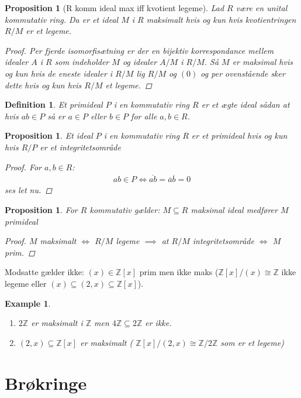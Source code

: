 \documentclass[10pt,twoside,openany,final]{memoir}
\theoremstyle{break}
\newtheorem{proposition}[section]{Proposition}
\newtheorem{definition}[section]{Definition}
\theoremstyle{Break}
\newtheorem{example}[section]{Example}
\newcommand{\Z}{\mathbb{Z}}
\begin{document}
\begin{proposition}[R komm ideal max iff kvotient legeme]
Lad $R$ være en unital kommutativ ring. Da er et ideal $M$ i $R$ maksimalt hvis og kun hvis kvotientringen $R/M$ er et legeme.
\begin{proof}
Per fjerde isomorfisætning er der en bijektiv korrespondance mellem idealer $A$ i $R$ som indeholder $M$ og idealer $A/M$ i $R/M$. Så $M$ er maksimal hvis og kun hvis de eneste idealer i $R/M$ lig $R/M$ og $(0)$ og per ovenstående sker dette hvis og kun hvis $R/M$ et legeme.
\end{proof}
\end{proposition}

\begin{definition}
Et primideal $P$ i en kommutativ ring $R$ er et ægte ideal sådan at hvis $ab \in P$ så er $a \in P$ eller $b \in P$ for alle $a,b \in R$.
\end{definition}

\begin{proposition}
Et ideal $P$ i en kommutativ ring $R$ er et primideal hvis og kun hvis $R/P$ er et integritetsområde
\begin{proof}
For $a,b \in R$: 
\begin{align*}
ab \in P \iff \overline{ab}=\overline{a}\overline{b}=0
\end{align*}
ses let nu.
\end{proof}
\end{proposition}

\begin{proposition}
For $R$ kommutativ gælder: $M \subseteq R$ maksimal ideal medfører $M$ primideal
\begin{proof}
$M$ maksimalt $\iff$ $R/M$ legeme $\implies$ at $R/M$ integritetsområde $\iff$ $M$ prim.
\end{proof}
\end{proposition}
Modsatte gælder ikke: $(x) \in \Z[x]$ prim men ikke maks ($\Z[x]/(x) \cong \Z$ ikke legeme eller $(x) \subseteq (2,x) \subseteq \Z[x]$).
\begin{example}
\begin{enumerate}
\item $2\Z$ er maksimalt i $\Z$ men $4\Z \subseteq 2\Z$ er ikke.
\item $(2,x) \subseteq \Z[x]$ er maksimalt ( $\Z[x] /(2,x) \cong \Z/2\Z$ som er et legeme)
\end{enumerate}
\end{example}

\chapter{Brøkringe}
\end{document}
